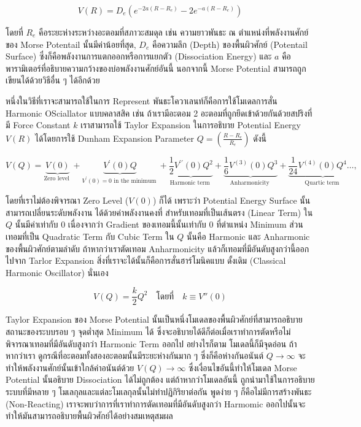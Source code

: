 \begin{equation}
  \label{eq:potential_bond_stretch}
  V(R) = D_{e} \left( e^{-2a(R-R_{e})} -2e^{-a(R-R_{e})} \right)
\end{equation}

\noindent โดยที่ $R_{e}$ คือระยะห่างระหว่างอะตอมที่สภาวะสมดุล เช่น ความยาวพันธะ ณ ตำแหน่งที่พลังงานศักย์ของ Morse Potentail
นั้นมีค่าน้อยที่สุด, $D_{e}$ คือความลึก (Depth) ของพื้นผิวศักย์ (Potentail Surface) ซึ่งก็คือพลังงานการแตกออกหรือการแยกตัว (Dissociation
Energy) และ $a$ คือพารามิเตอร์ที่อธิบายความกว้างของบ่อพลังงานศักย์อันนี้ นอกจากนี้ Morse Potential สามารถถูกเขียนได้ด้วยวิธีอื่น ๆ ได้อีกด้วย

หนึ่งในวิธีที่เราจะสามารถใช้ในการ Represent พันธะโควาเลนท์ก็คือการใช้โมเดลการสั่น Harmonic OSciallator แบบคลาสสิค
เช่น ถ้าเรามีอะตอม 2 อะตอมที่ถูกยึดเข้าด้วยกันด้วยสปริงที่มี Force Constant $k$ เราสามารถใช้ Taylor Expansion ในการอธิบาย Potential
Energy $V(R)$ ได้โดยการใช้ Dunham Expansion Parameter $Q = (\frac{R-R_{e}}{R_{e}})$ ดังนี้

\begin{equation}
  V(Q)
  =
  \underbrace{V(0)}_{\text{Zero level }}
  + \underbrace{V^{\prime}(0) Q}_{V^{\prime}(0)=0 \text{ in the minimum }}
  + \underbrace{\frac{1}{2} V^{\prime \prime}(0) Q^2}_{\text{Harmonic term }}
  + \underbrace{\frac{1}{6} V^{(3)}(0) Q^3}_{\text{Anharmonicity }}
  + \underbrace{\frac{1}{24} V^{(4)}(0) Q^4 \ldots,}_{\text{Quartic term }}
\end{equation}

\noindent โดยที่เราไม่ต้องพิจารณา Zero Level ($V(0)$) ก็ได้ เพราะว่า Potential Energy Surface นั้นสามารถเปลี่ยนระดับพลังงาน%
ได้ด้วยค่าพลังงานคงที่ สำหรับเทอมที่เป็นเส้นตรง (Linear Term) ใน $Q$ นั้นมีค่าเท่ากับ 0 เนื่องจากว่า Gradient ของเทอมนี้นั้นเท่ากับ 0
ที่ตำแหน่ง Minimum ส่วนเทอมที่เป็น Quadratic Term กับ Cubic Term ใน $Q$ นั้นคือ Harmonic และ Anharmonic ของพื้นผิวศักย์ตามลำดับ
ถ้าหากว่าเราตัดเทอม Anharmonicity แล้วก็เทอมที่มีอันดับสูงกว่านี้ออกไปจาก Tarlor Expansion สิ่งที่เราจะได้นั้นก็คือการสั่นฮาร์โมนิคแบบ%
ดั้งเดิม (Classical Harmonic Oscillator) นั่นเอง

\begin{equation}
  V(Q)
  =
  \frac{k}{2} Q^{2} \quad \text{โดยที่} \quad k \equiv V''(0)
\end{equation}

Taylor Expansion ของ Morse Potential นั้นเป็นหนึ่งโมเดลของพื้นผิวศักย์ที่สามารถอธิบายสถานะของระบบรอบ ๆ จุดต่ำสุด Minimum ได้
ซึ่งจะอธิบายได้ดีก็ต่อเมื่อเราทำการตัดหรือไม่พิจารณาเทอมที่มีอันดับสูงกว่า Harmonic Term ออกไป อย่างไรก็ตาม โมเดลนี้ก็มีจุดอ่อน ถ้าหากว่าเรา%
ดูกรณีที่อะตอมทั้งสองอะตอมนั้นมีระยะห่างกันมาก ๆ ซึ่งก็คือห่างกันอนันต์ $Q \rightarrow \infty$ จะทำให้พลังงานศักย์นั้นเข้าใกล้ค่าอนันต์ด้วย
$V(Q) \rightarrow \infty$ ซึ่งเงื่อนไขอันนี้ทำให้โมเดล Morse Potential นั้นอธิบาย Dissociation ได้ไม่ถูกต้อง แต่ถ้าหากว่าโมเดลอันนี้%
ถูกนำมาใช้ในการอธิบายระบบที่มีหลาย ๆ โมเลกุลและแต่ละโมเลกุลนั้นไม่ทำปฏิกิริยาต่อกัน พูดง่าย ๆ ก็คือไม่มีการสร้างพันธะ (Non-Reacting)
เราจะพบว่าการที่เราทำการตัดเทอมที่มีอันดับสูงกว่า Harmomic ออกไปนั้นจะทำให้มันสามารถอธิบายพื้นผิวศักย์ได้อย่างสมเหตุสมผล

